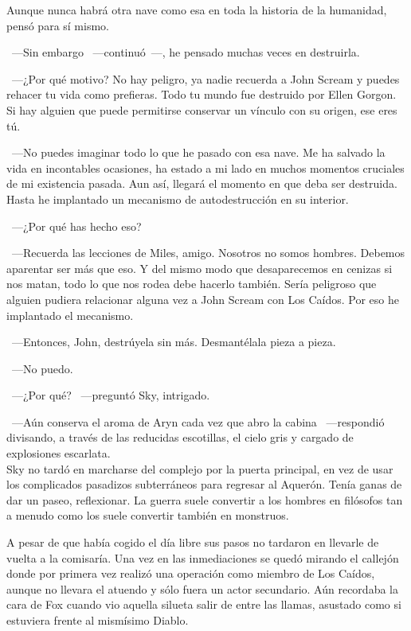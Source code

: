 Aunque nunca habrá otra nave como esa en toda la historia de la humanidad, pensó para sí mismo.

~---Sin embargo ~---continuó~---, he pensado muchas veces en destruirla.

~---¿Por qué motivo? No hay peligro, ya nadie recuerda a John Scream y puedes rehacer tu vida como prefieras. Todo tu mundo fue destruido por Ellen Gorgon. Si hay alguien que puede permitirse conservar un vínculo con su origen, ese eres tú.

~---No puedes imaginar todo lo que he pasado con esa nave. Me ha salvado la vida en incontables ocasiones, ha estado a mi lado en muchos momentos cruciales de mi existencia pasada. Aun así, llegará el momento en que deba ser destruida. Hasta he implantado un mecanismo de autodestrucción en su interior.

~---¿Por qué has hecho eso?

~---Recuerda las lecciones de Miles, amigo. Nosotros no somos hombres. Debemos aparentar ser más que eso. Y del mismo modo que desaparecemos en cenizas si nos matan, todo lo que nos rodea debe hacerlo también. Sería peligroso que alguien pudiera relacionar alguna vez a John Scream con Los Caídos. Por eso he implantado el mecanismo.

~---Entonces, John, destrúyela sin más. Desmantélala pieza a pieza.

~---No puedo.

~---¿Por qué? ~---preguntó Sky, intrigado.

~---Aún conserva el aroma de Aryn cada vez que abro la cabina ~---respondió divisando, a través de las reducidas escotillas, el cielo gris y cargado de explosiones escarlata.\\

\noindent{}Sky no tardó en marcharse del complejo por la puerta principal, en vez de usar los complicados pasadizos subterráneos para regresar al Aquerón. Tenía ganas de dar un paseo, reflexionar. La guerra suele convertir a los hombres en filósofos tan a menudo como los suele convertir también en monstruos.

A pesar de que había cogido el día libre sus pasos no tardaron en llevarle de vuelta a la comisaría. Una vez en las inmediaciones se quedó mirando el callejón donde por primera vez realizó una operación como miembro de Los Caídos, aunque no llevara el atuendo y sólo fuera un actor secundario. Aún recordaba la cara de Fox cuando vio aquella silueta salir de entre las llamas, asustado como si estuviera frente al mismísimo Diablo.


